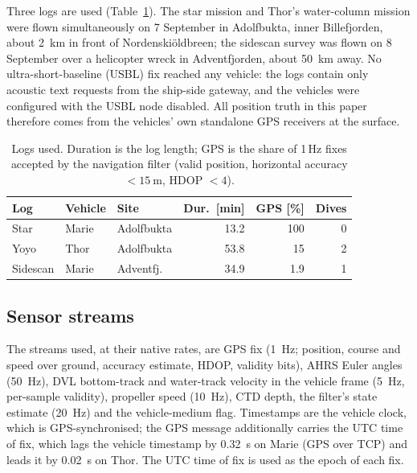 \documentclass[conference]{IEEEtran}
\begin{document}
Three logs are used (Table~\ref{tab:logs}). The star mission and Thor's water-column mission were flown simultaneously on 7 September in Adolfbukta, inner Billefjorden, about \SI{2}{\kilo\meter} in front of Nordenskiöldbreen; the sidescan survey was flown on 8 September over a helicopter wreck in Adventfjorden, about \SI{50}{\kilo\meter} away. No ultra-short-baseline (USBL) fix reached any vehicle: the logs contain only acoustic text requests from the ship-side gateway, and the vehicles were configured with the USBL node disabled. All position truth in this paper therefore comes from the vehicles' own standalone GPS receivers at the surface.

\begin{table}[t]
\caption{Logs used. Duration is the log length; GPS is the share of 1\,Hz fixes accepted by the navigation filter (valid position, horizontal accuracy $<\SI{15}{\meter}$, HDOP $<4$).}
\label{tab:logs}
\centering
\small
\setlength{\tabcolsep}{4pt}
\begin{tabular}{@{}lllrrr@{}}
\toprule
Log & Vehicle & Site & Dur.\ [min] & GPS [\%] & Dives \\
\midrule
Star & Marie & Adolfbukta & 13.2 & 100 & 0 \\
Yoyo & Thor & Adolfbukta & 53.8 & 15 & 2 \\
Sidescan & Marie & Adventfj. & 34.9 & 1.9 & 1 \\
\bottomrule
\end{tabular}
\end{table}

\subsection{Sensor streams}

The streams used, at their native rates, are GPS fix (\SI{1}{\hertz}; position, course and speed over ground, accuracy estimate, HDOP, validity bits), AHRS Euler angles (\SI{50}{\hertz}), DVL bottom-track and water-track velocity in the vehicle frame (\SI{5}{\hertz}, per-sample validity), propeller speed (\SI{10}{\hertz}), CTD depth, the filter's state estimate (\SI{20}{\hertz}) and the vehicle-medium flag. Timestamps are the vehicle clock, which is GPS-synchronised; the GPS message additionally carries the UTC time of fix, which lags the vehicle timestamp by \SI{0.32}{\second} on Marie (GPS over TCP) and leads it by \SI{0.02}{\second} on Thor. The UTC time of fix is used as the epoch of each fix.
\end{document}
